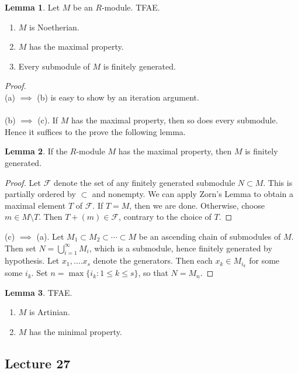 \documentclass[10pt,letterpaper,cm]{nupset}
\theoremstyle{definition}
\newtheorem{lemma}{Lemma}
\newcommand{\1}{\mathbf{1}}
\newcommand{\0}{\vec 0}
\begin{document}
\begin{lemma} Let $M$ be an $R$-module. TFAE.
\begin{enumerate}[label=(\alph*)]
\item $M$ is Noetherian.
\item $M$ has the maximal property. 
\item Every submodule of $M$ is finitely generated. 
\end{enumerate}
\end{lemma}
\begin{proof} $ $ \\
(a) $\implies$ (b) is easy to show by an iteration argument.
\\ \\ (b) $\implies$ (c). If $M$ has the maximal property, then so does every submodule. Hence it suffices to the prove the following lemma.
\begin{lemma}
If the $R$-module $M$ has the maximal property, then $M$ is finitely generated.
\end{lemma}
\begin{proof}
Let $\mathcal{F}$ denote the set of any finitely generated submodule $N\subset M$. This is partially ordered by $\subset$ and nonempty. We can apply Zorn's Lemma to obtain a maximal element $T$ of $\mathcal{F}$. If $T=M$, then we are done. Otherwise, choose $m\in M \setminus T$. Then $T + (m) \in \mathcal{F}$, contrary to the choice of $T$. 
\end{proof}
(c) $\implies$ (a). Let $M_1 \subset M_2 \subset \cdots \subset M$ be an ascending chain of submodules of $M$. Then set $N= \bigcup_{i=1}^{\infty} M_i$, which is a submodule, hence finitely generated by hypothesis. Let $x_1, \ldots. x_s$ denote the generators. Then each $x_k \in M_{i_k}$ for some some $i_k$. Set $n= \max\{i_k : 1\leq k \leq s\}$, so that $N = M_n$.
\end{proof}

\begin{lemma} TFAE.
\begin{enumerate}[label=(\alph*)]
\item $M$ is Artinian.
\item $M$ has the minimal property.
\end{enumerate}
\end{lemma}

\subsection{Lecture 27}
\end{document}
